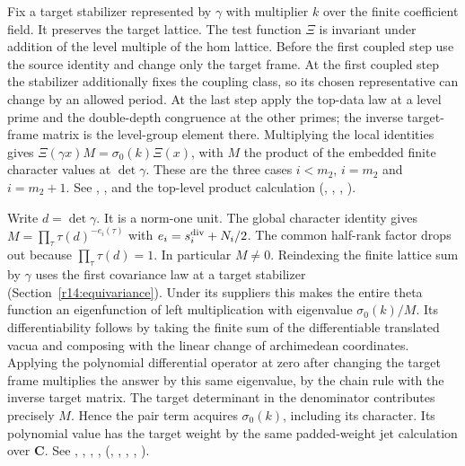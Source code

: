 Fix a target stabilizer represented by $\gamma$ with multiplier $k$
over the finite coefficient field. It preserves the target lattice.
The test function $\Xi$ is invariant under addition of the level
multiple of the hom lattice. Before the first coupled step use the
source identity and change only the target frame. At the first
coupled step the stabilizer additionally fixes the coupling class,
so its chosen representative can change by an allowed period. At the
last step apply the top-data law at a level prime and the double-depth
congruence at the other primes; the inverse target-frame matrix is
the level-group element there. Multiplying the local identities gives
$\Xi(\gamma x)M=\sigma_0(k)\Xi(x)$, with $M$ the product of the
embedded finite character values at $\det\gamma$. These are the
three cases $i<m_2$, $i=m_2$ and $i=m_2+1$.
See , , 
and the top-level product calculation
(, ,
, ).

Write $d=\det\gamma$. It is a norm-one unit. The global character
identity gives $M=\prod_\tau\tau(d)^{-e_i(\tau)}$ with
$e_i=s^{\rm div}_i+N_i/2$. The common half-rank factor drops out
because $\prod_\tau\tau(d)=1$. In particular $M\ne0$.
Reindexing the finite lattice sum by $\gamma$ uses the first covariance law
at a target stabilizer (Section~\ref{r14:equivariance}). Under its suppliers
this makes the entire theta function
an eigenfunction of left multiplication with eigenvalue
$\sigma_0(k)/M$. Its differentiability follows by taking the finite
sum of the differentiable translated vacua and composing with the
linear change of archimedean coordinates. Applying the polynomial
differential operator at zero after changing the target frame
multiplies the answer by this same eigenvalue, by the chain rule
with the inverse target matrix. The target determinant in the
denominator contributes precisely $M$. Hence the pair term acquires
$\sigma_0(k)$, including its character. Its polynomial value has the
target weight by the same padded-weight jet calculation over
$\mathbf C$. See , ,
, , 
(, ,
, ,
).

